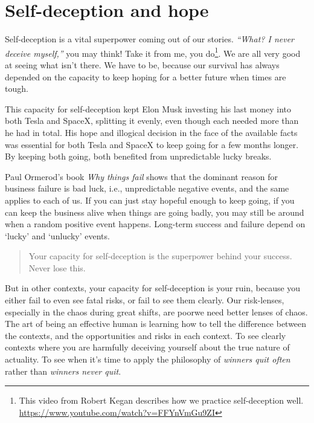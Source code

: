\section{Self-deception and hope}
\label{self-deception}
Self-deception  is a vital superpower coming out of our stories. \emph{“What? I never deceive myself,”} you may think! Take it from me, you do\footnote{This video from Robert Kegan  describes how we practice self-deception well. \url{https://www.youtube.com/watch?v=FFYnVmGu9ZI}}. We are all very good at seeing what isn't there\cite{wiseman-paranormality}. We have to be, because our survival has always depended on the capacity to keep hoping for a better future when times are tough. 


This capacity for self-deception kept Elon Musk investing his last money into both Tesla and SpaceX, splitting it evenly, even though each needed more than he had in total. His hope and illogical decision in the face of the available facts was essential for both Tesla and SpaceX to keep going for a few months longer. By keeping both going, both benefited from unpredictable lucky breaks. 


Paul Ormerod's book\cite{ormerod-why-fail} \emph{Why things fail}  shows that the dominant reason for business failure is bad luck, i.e., unpredictable negative events, and the same applies to each of us. If you can just stay hopeful enough to keep going, if you can keep the business alive when things are going badly, you may still be around when a random positive event happens. Long-term success and failure depend on ‘lucky’ and ‘unlucky’ events. 


\begin{quotation}
Your capacity for self-deception is the superpower behind your success. Never lose this.
\end{quotation}


But in other contexts, your capacity for self-deception is your ruin, because you either fail to even see fatal risks, or fail to see them clearly. Our risk-lenses, especially in the chaos during great shifts, are poor\textemdash we need better lenses of chaos. The art of being an effective human is learning how to tell the difference between the contexts, and the opportunities and risks\cite{schrager-brothel} in each context. To see clearly contexts where you are harmfully deceiving yourself about the true nature of actuality. To see when it's time to apply the philosophy of \emph{winners quit often} rather than \emph{winners never quit}\cite{godin-dip}.


